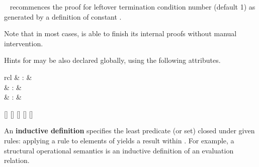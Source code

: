 \begin{isabellebody}
\begin{isamarkuptext}
\begin{description}
  \item \hyperlink{command.HOL.recdef-tc}{\mbox{}}~ recommences the
  proof for leftover termination condition number  (default
  1) as generated by a \hyperlink{command.HOL.recdef}{\mbox{}} definition of
  constant .

  Note that in most cases, \hyperlink{command.HOL.recdef}{\mbox{}} is able to finish
  its internal proofs without manual intervention.

  \end{description}

  \medskip Hints for \hyperlink{command.HOL.recdef}{\mbox{}} may be also declared
  globally, using the following attributes.

  \begin{matharray}{rcl}
    \hypertarget{attribute.HOL.recdef-simp}{\hyperlink{attribute.HOL.recdef-simp}{\mbox{}}} & : &  \\
    \hypertarget{attribute.HOL.recdef-cong}{\hyperlink{attribute.HOL.recdef-cong}{\mbox{}}} & : &  \\
    \hypertarget{attribute.HOL.recdef-wf}{\hyperlink{attribute.HOL.recdef-wf}{\mbox{}}} & : &  \\
  \end{matharray}

  \begin{railoutput}
\rail@bar
{}[]
[]
[]
\rail@endbar
\rail@bar
{}
[]
[]
\rail@endbar
\rail@end
\end{railoutput}%
\end{isamarkuptext}%
\isamarkuptrue%
%
\isamarkuptrue%
%
\begin{isamarkuptext}%
An \textbf{inductive definition} specifies the least predicate (or
  set)  closed under given rules: applying a rule to elements
  of  yields a result within .  For example, a
  structural operational semantics is an inductive definition of an
  evaluation relation.


\end{isamarkuptext}
\end{isabellebody}

